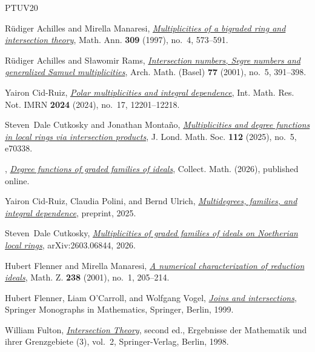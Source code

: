 \documentclass[a4paper, 11pt]{amsart}
\theoremstyle{definition}
\begin{document}
	
	\begin{thebibliography}{PTUV20}
		
		R{\"u}diger Achilles and Mirella Manaresi,
		\emph{\href{https://doi.org/10.1007/s002080050128}{Multiplicities of a
				bigraded ring and intersection theory}}, Math. Ann. \textbf{309} (1997),
		no.~4, 573--591.
		
		R{\"u}diger Achilles and S{\l}awomir Rams,
		\emph{\href{https://doi.org/10.1007/PL00000509}{Intersection numbers, Segre
				numbers and generalized Samuel multiplicities}}, Arch. Math. (Basel)
		\textbf{77} (2001), no.~5, 391--398.
		
		Yairon Cid-Ruiz,
		\emph{\href{https://doi.org/10.1093/imrn/rnae163}{Polar multiplicities and
				integral dependence}}, Int. Math. Res. Not. IMRN \textbf{2024} (2024),
		no.~17, 12201--12218.
		
		Steven~Dale Cutkosky and Jonathan Monta{\~n}o,
		\emph{\href{https://doi.org/10.1112/jlms.70338}{Multiplicities and degree
				functions in local rings via intersection products}}, J. Lond. Math. Soc.
		\textbf{112} (2025), no.~5, e70338.
		
		\bysame, \emph{\href{https://doi.org/10.1007/s13348-026-00519-w}{Degree
				functions of graded families of ideals}}, Collect. Math. (2026),
		published online.
		
		Yairon Cid-Ruiz, Claudia Polini, and Bernd Ulrich,
		\emph{\href{https://arxiv.org/abs/2405.07000}{Multidegrees, families, and
				integral dependence}}, preprint, 2025.
		
		Steven~Dale Cutkosky,
		\emph{\href{https://arxiv.org/abs/2603.06844}{Multiplicities of graded
				families of ideals on Noetherian local rings}}, arXiv:2603.06844, 2026.
		
		Hubert Flenner and Mirella Manaresi,
		\emph{\href{https://doi.org/10.1007/PL00004900}{A numerical characterization
				of reduction ideals}}, Math. Z. \textbf{238} (2001), no.~1, 205--214.
		
		Hubert Flenner, Liam O'Carroll, and Wolfgang Vogel,
		\emph{\href{https://doi.org/10.1007/978-3-662-03817-8}{Joins and
				intersections}}, Springer Monographs in Mathematics, Springer, Berlin, 1999.
		
		William Fulton,
		\emph{\href{https://doi.org/10.1007/978-1-4612-1700-8}{Intersection Theory}},
		second ed., Ergebnisse der Mathematik und ihrer Grenzgebiete (3), vol.~2,
		Springer-Verlag, Berlin, 1998.
		

\end{thebibliography}
\end{document}

